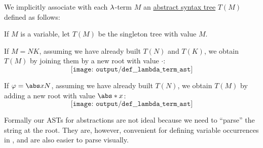 \begin{definition}\label{def:untyped_lambda_term_ast}
  We implicitly associate with each \( \mathrm{\lambda} \)-term \( M \) an \hyperref[con:abstract_syntax_tree]{abstract syntax tree} \( T(M) \) defined as follows:
  \begin{thmenum}
     If \( M \) is a variable, let \( T(M) \) be the singleton tree with value \( M \).

     If \( M = NK \), assuming we have already built \( T(N) \) and \( T(K) \), we obtain \( T(M) \) by joining them by a new root with value \( \cdot \):
    \begin{equation*}
      \texttt{[image: output/def\_\_lambda\_term\_ast]}
    \end{equation*}

     If \( \varphi = \abs x N \), assuming we have already built \( T(N) \), we obtain \( T(M) \) by adding a new root with value \( \abs* x \):
    \begin{equation*}
      \texttt{[image: output/def\_\_lambda\_term\_ast]}
    \end{equation*}
  \end{thmenum}
\end{definition}
\begin{comments}
  \item Formally our ASTs for abstractions are not ideal because we need to \enquote{parse} the string at the root. They are, however, convenient for defining variable occurrences in , and are also easier to parse visually.
\end{comments}

